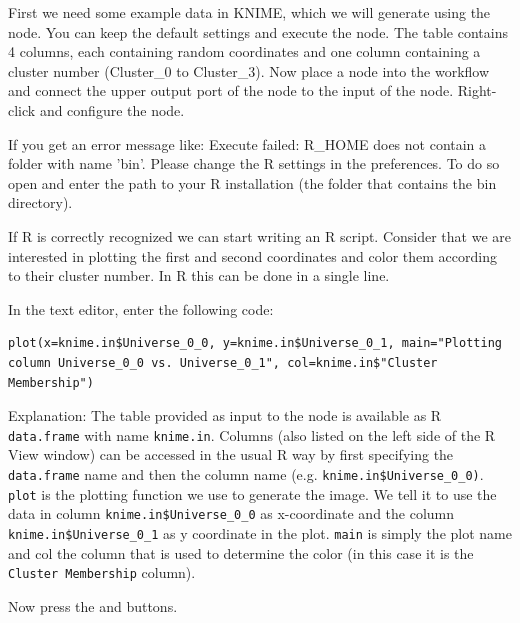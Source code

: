 \begin{task}
First we need some example data in KNIME, which we will generate using the  node. You can keep the default settings and execute the node. The table contains 4 columns, each containing random coordinates and one column containing a cluster number (Cluster\_0 to Cluster\_3). Now place a  node into the workflow and connect the upper output port of the  node to the input of the  node.
Right-click and configure the node.

If you get an error message like: Execute failed: R\_HOME does not contain a folder with name 'bin'. Please change the R settings in the preferences. To do so open  and enter the path to your R installation (the folder that contains the bin directory).

If R is correctly recognized we can start writing an R script. Consider that we are interested in plotting the first and second coordinates and color them according to their cluster number. In R this can be done in a single line.

In the  text editor, enter the following code:
\begin{lstlisting}
plot(x=knime.in$Universe_0_0, y=knime.in$Universe_0_1, main="Plotting column Universe_0_0 vs. Universe_0_1", col=knime.in$"Cluster Membership")
\end{lstlisting}
        
Explanation:
The table provided as input to the  node is available as R \texttt{data.frame} with name \texttt{knime.in}. Columns (also listed on the left side of the R View window) can be accessed in the usual R way by first specifying the \texttt{data.frame} name and then the column name (e.g. \texttt{knime.in\$Universe\_0\_0)}.
\texttt{plot} is the plotting function we use to generate the image. We tell it to use the data in column \texttt{knime.in\$Universe\_0\_0} as x-coordinate and the column \texttt{knime.in\$Universe\_0\_1} as y coordinate in the plot. \texttt{main} is simply the plot name and col the column that is used to determine the color (in this case it is the \texttt{Cluster Membership} column).

Now press the  and  buttons.
\end{task}

